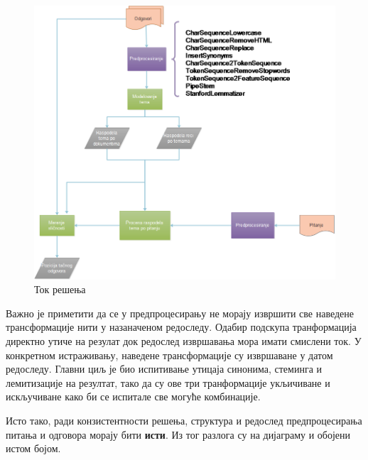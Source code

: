 \begin{figure}[H]
    \centering
   \includegraphics[scale=0.7]{./Slike/slika38.png} 
	\caption{Ток решења}
	\label{fig:slika1}
\end{figure}


Важно је приметити да се у предпроцесирању не морају извршити све наведене трансформације нити у назаначеном редоследу. Одабир подскупа транформација директно утиче на резулат док редослед извршавања мора имати смислени ток. У конкретном истраживању, наведене трансформације су извршаване у датом редоследу. Главни циљ је био испитивање утицаја синонима, стеминга и лемитизације на резултат, тако да су ове три транформације укљичиване и искључиване како би се испитале све могуће комбинације.

Исто тако, ради конзистентности решења, структура и редослед предпроцесирања питања и одговора морају бити \textbf{исти}. Из тог разлога су на дијаграму и обојени истом бојом.


